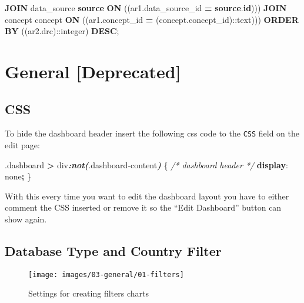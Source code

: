 \documentclass[
]{book}
\newenvironment{Shaded}{\begin{snugshade}}{\end{snugshade}}
\newcommand{\CharTok}[1]{\textcolor[rgb]{0.31,0.60,0.02}{#1}}
\newcommand{\CommentTok}[1]{\textcolor[rgb]{0.56,0.35,0.01}{\textit{#1}}}
\newcommand{\DecValTok}[1]{\textcolor[rgb]{0.00,0.00,0.81}{#1}}
\newcommand{\FunctionTok}[1]{\textcolor[rgb]{0.00,0.00,0.00}{#1}}
\newcommand{\InformationTok}[1]{\textcolor[rgb]{0.56,0.35,0.01}{\textbf{\textit{#1}}}}
\newcommand{\KeywordTok}[1]{\textcolor[rgb]{0.13,0.29,0.53}{\textbf{#1}}}
\newcommand{\NormalTok}[1]{#1}
\newcommand{\OperatorTok}[1]{\textcolor[rgb]{0.81,0.36,0.00}{\textbf{#1}}}
\begin{document}
\begin{Shaded}
\begin{Highlighting}[]
    \KeywordTok{JOIN}\NormalTok{ data\_source }\KeywordTok{source} \KeywordTok{ON}\NormalTok{ ((ar1.data\_source\_id }\OperatorTok{=} \KeywordTok{source}\NormalTok{.}\KeywordTok{id}\NormalTok{)))}
    \KeywordTok{JOIN}\NormalTok{ concept concept }\KeywordTok{ON}\NormalTok{ ((ar1.concept\_id }\OperatorTok{=}\NormalTok{ (concept.concept\_id):}\CharTok{:text}\NormalTok{)))}
 \KeywordTok{ORDER} \KeywordTok{BY}\NormalTok{ ((ar2.drc):}\CharTok{:integer}\NormalTok{) }\KeywordTok{DESC}\NormalTok{;}
\end{Highlighting}
\end{Shaded}

\hypertarget{general-deprecated}{%
\section{General {[}Deprecated{]}}\label{general-deprecated}}

\hypertarget{css-2}{%
\subsection*{CSS}\label{css-2}}

To hide the dashboard header insert the following css code to the \texttt{CSS} field on the edit page:

\begin{Shaded}
\begin{Highlighting}[]
\FunctionTok{.dashboard} \OperatorTok{\textgreater{}}\NormalTok{ div}\InformationTok{:not(}\FunctionTok{.dashboard{-}content}\InformationTok{)}\NormalTok{ \{  }\CommentTok{/* dashboard header */}
  \KeywordTok{display}\NormalTok{: }\DecValTok{none}\OperatorTok{;}
\NormalTok{\}}
\end{Highlighting}
\end{Shaded}

With this every time you want to edit the dashboard layout you have to either comment the CSS inserted
or remove it so the ``Edit Dashboard'' button can show again.

\hypertarget{database-type-and-country-filter}{%
\subsection*{Database Type and Country Filter}\label{database-type-and-country-filter}}

\begin{figure}
\texttt{[image: images/03-general/01-filters]} \caption{Settings for creating filters charts}\label{fig:filters}
\end{figure}
\end{document}
